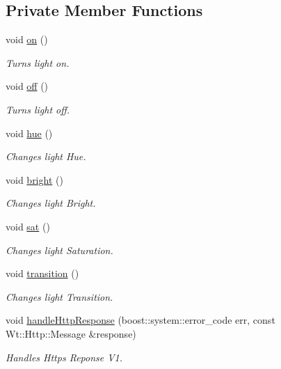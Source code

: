 \subsection*{Private Member Functions}
\begin{DoxyCompactItemize}
\item 
void \hyperlink{classSingleSchedulerControlWidget_a9bf7fc2a7f5777a9cd29ba290f61b328}{on} ()
\begin{DoxyCompactList}\small\item\em Turns light on. \end{DoxyCompactList}\item 
void \hyperlink{classSingleSchedulerControlWidget_af9a4503965dc2e65ce89ecf713b02142}{off} ()
\begin{DoxyCompactList}\small\item\em Turns light off. \end{DoxyCompactList}\item 
void \hyperlink{classSingleSchedulerControlWidget_a56c043e77f1fa91e9ccab3bcc144ef0e}{hue} ()
\begin{DoxyCompactList}\small\item\em Changes light Hue. \end{DoxyCompactList}\item 
void \hyperlink{classSingleSchedulerControlWidget_a0a8907804650230979459acd5939a532}{bright} ()
\begin{DoxyCompactList}\small\item\em Changes light Bright. \end{DoxyCompactList}\item 
void \hyperlink{classSingleSchedulerControlWidget_a1e7fe9995f628b039703c16e0309a449}{sat} ()
\begin{DoxyCompactList}\small\item\em Changes light Saturation. \end{DoxyCompactList}\item 
void \hyperlink{classSingleSchedulerControlWidget_a19a9fc395a8496d67130fb15f15a22c0}{transition} ()
\begin{DoxyCompactList}\small\item\em Changes light Transition. \end{DoxyCompactList}\item 
void \hyperlink{classSingleSchedulerControlWidget_a323e0c1f1a0b7a3c1756e59f121f2686}{handle\+Http\+Response} (boost\+::system\+::error\+\_\+code err, const Wt\+::\+Http\+::\+Message \&response)
\begin{DoxyCompactList}\small\item\em Handles Https Reponse V1. \end{DoxyCompactList}\item 

\end{DoxyCompactItemize}
